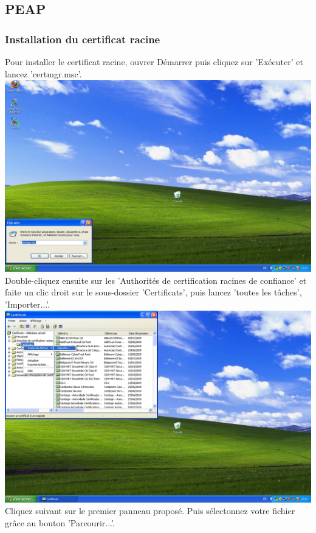 \subsection{PEAP}

\subsubsection{Installation du certificat racine}
Pour installer le certificat racine, ouvrer Démarrer puis cliquez sur 'Exécuter' et lancez 'certmgr.msc'.\\
\includegraphics[width=\screenShotSize{}]{img/certmgr.PNG}\\
Double-cliquez ensuite sur les 'Authorités de certification racines de confiance' et faite un clic droit sur le sous-dossier 'Certificats', puis lancez 'toutes les tâches', 'Importer...'.\\
\includegraphics[width=\screenShotSize{}]{img/importCacert.PNG}\\
Cliquez suivant sur le premier panneau proposé. Puis sélectonnez votre fichier grâce au bouton 'Parcourir...'.\\
